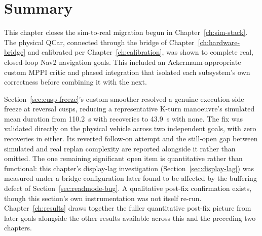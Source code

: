 \section{Summary}
\label{sec:nav-integration-summary}

This chapter closes the sim-to-real migration begun in
Chapter~\ref{ch:sim-stack}. The physical QCar, connected through the
bridge of Chapter~\ref{ch:hardware-bridge} and calibrated per
Chapter~\ref{ch:calibration}, was shown to complete real, closed-loop
Nav2 navigation goals. This included an Ackermann-appropriate custom
MPPI critic and phased integration that isolated each subsystem's own
correctness before combining it with the next.

Section~\ref{sec:cusp-freeze}'s custom smoother resolved a genuine
execution-side freeze at reversal cusps, reducing a representative
K-turn manoeuvre's simulated mean duration from \SI{110.2}{\second}
with recoveries to \SI{43.9}{\second} with none. The fix was validated
directly on the physical vehicle across two independent goals, with
zero recoveries in either. Its reverted follow-on attempt and
the still-open gap between simulated and real replan complexity are
reported alongside it rather than omitted. The one remaining significant open item is quantitative
rather than functional: this chapter's display-lag investigation
(Section~\ref{sec:display-lag}) was measured under a bridge
configuration later found to be affected by the buffering defect of
Section~\ref{sec:readmode-bug}. A qualitative post-fix confirmation
exists, though this section's own instrumentation was not itself
re-run. Chapter~\ref{ch:results} draws together the fuller
quantitative post-fix picture from later goals alongside the other
results available across this and the preceding two chapters.
